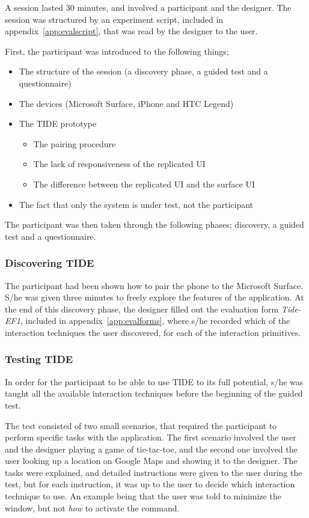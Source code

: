 A session lasted 30 minutes, and involved a participant and the designer.
The session was structured by an experiment script, included in appendix~\ref{app:evalscript}, that was read by the designer to the user.

First, the participant was introduced to the following things;
\begin{itemize}
\item The structure of the session (a discovery phase, a guided test and a questionnaire)
\item The devices (Microsoft Surface, iPhone and HTC Legend)
\item The TIDE prototype
	\begin{itemize}
	\item The pairing procedure
	\item The lack of responsiveness of the replicated UI
	\item The difference between the replicated UI and the surface UI
	\end{itemize}
\item The fact that only the system is under test, not the participant
\end{itemize}

The participant was then taken through the following phases; discovery, a guided test and a questionnaire.

\subsubsection{Discovering TIDE}

The participant had been shown how to pair the phone to the Microsoft Surface.
S/he was given three minutes to freely explore the features of the application.
At the end of this discovery phase, the designer filled out the evaluation form \emph{Tide-EF1}, included in appendix~\ref{app:evalforms}, where s/he recorded which of the interaction techniques the user discovered, for each of the interaction primitives.

\subsubsection{Testing TIDE}

In order for the participant to be able to use TIDE to its full potential, s/he was taught all the available interaction techniques before the beginning of the guided test.

The test consisted of two small scenarios, that required the participant to perform specific tasks with the application.
The first scenario involved the user and the designer playing a game of tic-tac-toe, and the second one involved the user looking up a location on Google Maps and showing it to the designer.
The tasks were explained, and detailed instructions were given to the user during the test, but for each instruction, it was up to the user to decide which interaction technique to use.
An example being that the user was told to minimize the window, but not \emph{how} to activate the command.

